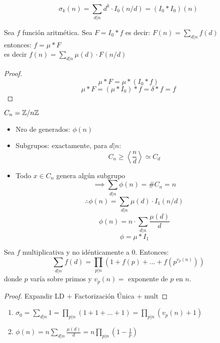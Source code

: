     \begin{ejm}
        \[\sigma_k(n)=\sum_{d|n}d^k\cdot I_0(n/d)=(I_0*I_0)(n)\]
    \end{ejm}
    \begin{cor}
        Sea $f$ función aritmética. Sea $F=I_0*f$ es decir: $F(n)=\sum_{d|n}f(d)$\\
        entonces: $f=\mu*F$\\
        es decir $f(n)=\sum_{d|n}\mu(d)\cdot F(n/d)$
    \end{cor}
    \begin{proof}
        \[\mu*F=\mu*(I_0*f)\]
        \[\mu*F=(\mu*I_0)*f=\delta*f=f\]
    \end{proof}
    \begin{ejm}
        $C_n=\mathbb{Z}/n\mathbb{Z}$
        \begin{itemize}
            \item Nro de generados: $\phi(n)$

            \item Subgrupos: exactamente, para $d|n$:
            \[C_n\geq\left\langle\frac{n}{d}\right\rangle\simeq C_d\]

            \item Todo $x\in C_n$ genera algún subgrupo
            \[\implies \sum_{d|n}\phi(n)=\#C_n=n\]
            \[\therefore \phi(n)=\sum_{d|n}\mu(d)\cdot I_1(n/d)\]
            \[\phi(n)=n\cdot\sum_{d|n}\frac{\mu(d)}{d}\]
            \[\phi=\mu*I_1\]
        \end{itemize}
    \end{ejm}
    \begin{thm}[$\Sigma\rightarrow\Pi$]
        Sea $f$ multiplicativa y no idénticamente a $0$. Entonces:
        \[\sum_{d|n}f(d)=\prod_{p|n}(1+f(p)+...+f(p^{v_p(n)}))\]
        donde $p$ varía sobre primos y $v_p(n)=$ exponente de $p$ en $n$.
    \end{thm}
    \begin{proof}
        Expandir LD + Factorización Única + mult
    \end{proof}
    \begin{ejm}
        \begin{enumerate}[label=(\alph*)]
            \item $\sigma_0=\sum_{d|n}1=\prod_{p|n}(1+1+...+1)=\prod_{p|n}(v_p(n)+1)$

            \item $\phi(n)=n\sum_{d|n}\frac{\mu(d)}{d}=n\prod_{p|n}(1-\frac{1}{p})$
        \end{enumerate}
    \end{ejm}
